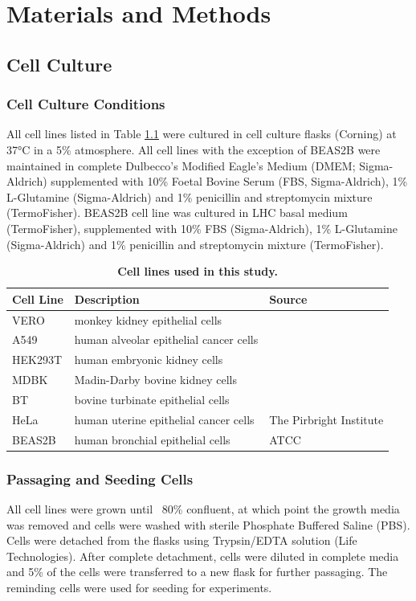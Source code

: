 \chapter{Materials and Methods} \label{ch:Materials and Methods}
\section{Cell Culture} \label{sec:Cell Culture}
\subsection{Cell Culture Conditions} \label{subsec:Cell Culture Conditions}
All cell lines listed in Table \ref{tab:Cell Lines Table} were cultured in cell culture flasks (Corning) at 37°C in a 5\%  atmosphere. All cell lines with the exception of BEAS2B were maintained in complete Dulbecco’s Modified Eagle's Medium (DMEM; Sigma-Aldrich) supplemented with 10\% Foetal Bovine Serum (FBS, Sigma-Aldrich), 1\% L-Glutamine (Sigma-Aldrich) and 1\% penicillin and streptomycin mixture (TermoFisher). BEAS2B cell line was cultured in LHC basal medium (TermoFisher), supplemented with 10\% FBS (Sigma-Aldrich), 1\% L-Glutamine (Sigma-Aldrich) and 1\% penicillin and streptomycin mixture (TermoFisher).

\begin{table}
  \centering
  \begin{tabular}{lll}
    \toprule
    {\textbf{Cell Line}} &
  {\textbf{Description}} &
  {\textbf{Source}} \\ \midrule
    VERO & monkey kidney epithelial cells & \\ 
    A549 & human alveolar epithelial cancer cells &   \\
    HEK293T & human embryonic kidney cells &  \\ 
    MDBK & Madin-Darby bovine kidney cells &  \\
    BT & bovine turbinate epithelial cells &  \\
    HeLa & human uterine epithelial cancer cells &
    \multirow{-6}{*}{The Pirbright Institute}
    \\
    BEAS2B & human bronchial epithelial cells & ATCC  \\ \bottomrule
  \end{tabular}
  \caption[Cell lines used in this study.]{\textbf{Cell lines used in this study.}}
  \label{tab:Cell Lines Table}
\end{table}

\subsection{Passaging and Seeding Cells} \label{subsec:Passaging and Seeding Cells}
All cell lines were grown until ~80\% confluent, at which point the growth media was removed and cells were washed with sterile Phosphate Buffered Saline (PBS). Cells were detached from the flasks using Trypsin/EDTA solution (Life Technologies). After complete detachment, cells were diluted in complete media and 5\% of the cells were transferred to a new flask for further passaging. The reminding cells were used for seeding for experiments.

